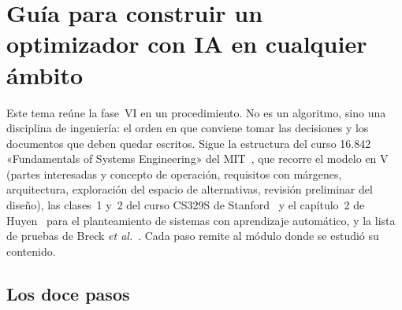 \chapter{Guía para construir un optimizador con IA en cualquier ámbito}
\label{tema:6}

Este tema reúne la fase~VI en un procedimiento. No es un algoritmo, sino una disciplina de ingeniería: el orden en que conviene tomar las decisiones y los documentos que deben quedar escritos. Sigue la estructura del curso 16.842 «Fundamentals of Systems Engineering» del MIT~\cite{mit16842}, que recorre el modelo en V (partes interesadas y concepto de operación, requisitos con márgenes, arquitectura, exploración del espacio de alternativas, revisión preliminar del diseño), las clases~1 y~2 del curso CS329S de Stanford~\cite{cs329s} y el capítulo~2 de Huyen~\cite{huyen} para el planteamiento de sistemas con aprendizaje automático, y la lista de pruebas de Breck \emph{et al.}~\cite{breck}. Cada paso remite al módulo donde se estudió su contenido.

\section{Los doce pasos}

